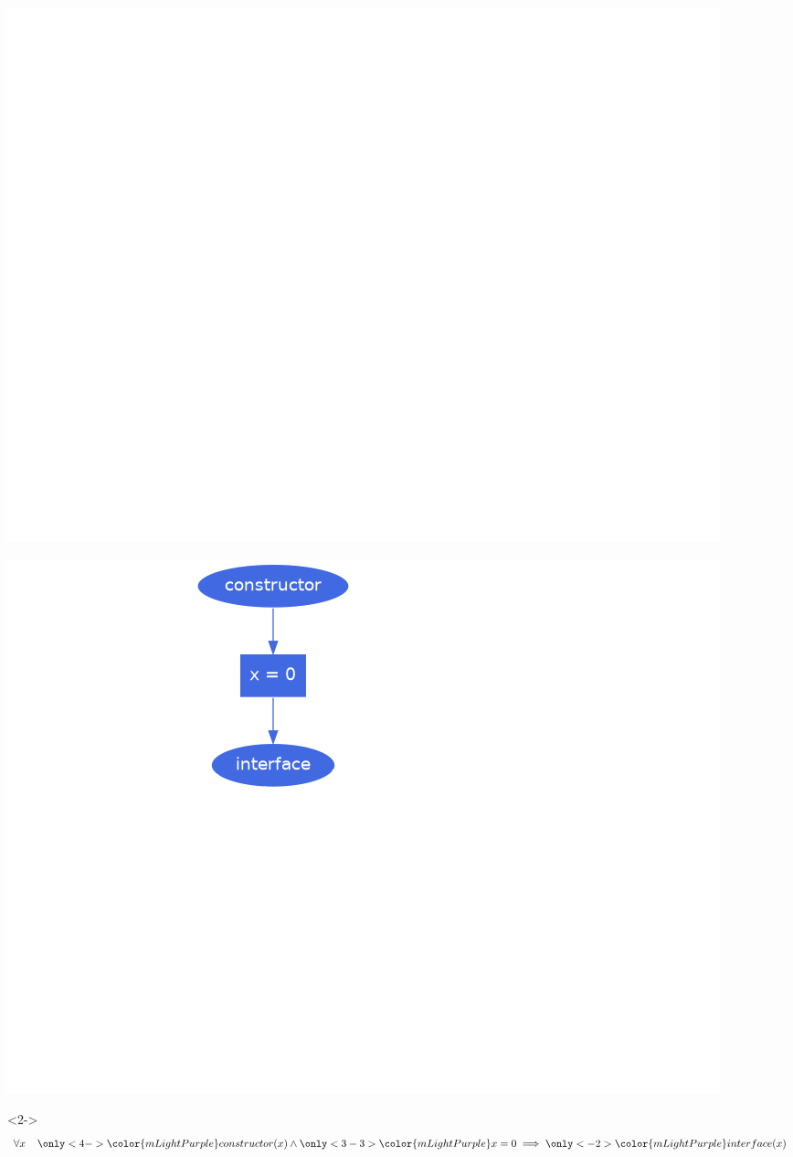 \documentclass[aspectratio=169,10pt]{beamer}
\begin{document}
\begin{frame}[fragile]
\begin{figure}
	\includegraphics[scale=0.3]{images/state_machine}
\end{figure}
\end{frame}

\begin{frame}[fragile]
\begin{figure}
\noindent\begin{minipage}{.49\textwidth}
	\includegraphics[scale=0.3]{images/state_machine_transition}
\end{minipage}
\noindent\begin{minipage}{.49\textwidth}
\begin{onlyenv}<2->
{\small
\begin{align*}
	\forall x \;\;\;\; {\only<4->{\color{mLightPurple}}constructor(x)} \land {\only<3-3>{\color{mLightPurple}}x = 0} \implies {\only<-2>{\color{mLightPurple}}interface(x)}\\
\end{align*}
}%
\end{onlyenv}
\end{minipage}
\end{figure}
\end{frame}
\end{document}

